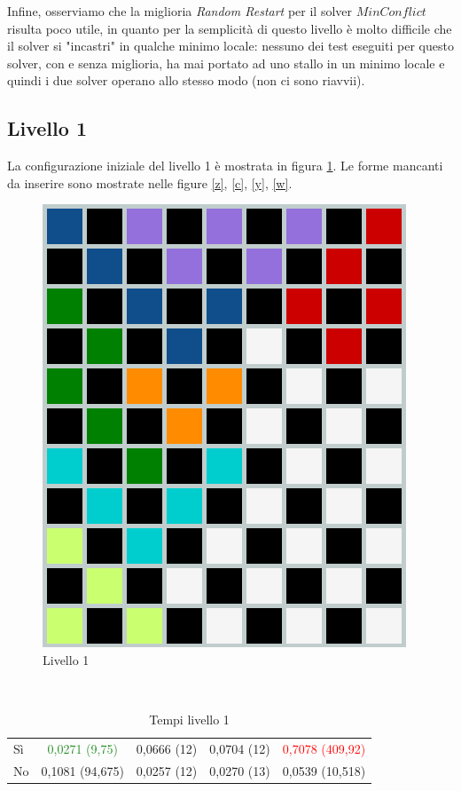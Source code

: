 Infine, osserviamo che la miglioria \textit{Random Restart} per il solver $MinConflict$ risulta poco utile, in quanto per la semplicità di questo livello è molto difficile che il solver si "incastri" in qualche minimo locale: nessuno dei test eseguiti per questo solver, con e senza miglioria, ha mai portato ad uno stallo in un minimo locale e quindi i due solver operano allo stesso modo (non ci sono riavvii).
\subsection{Livello 1}
La configurazione iniziale del livello 1 è mostrata in figura \ref{lev1}. Le forme mancanti da inserire sono mostrate nelle figure \ref{z}, \ref{c}, \ref{y}, \ref{w}.
\begin{figure}[h]
	\centering
	\includegraphics[scale=0.3]{immagini/lv1}
	\caption{Livello 1}
	\label{lev1}
\end{figure}
\\
\noindent
\begin{table} [h]
	\begin{tabular}{|l||*{4}{c|}}\hline 
		\backslashbox{Miglioria}{Solver} 
		&\makebox{DFS}&\makebox{Backtracking}&\makebox{Recursive Backtracking}	&\makebox{MinConflict}\\ \hline 
		Sì&\textcolor{ForestGreen}{0,0271 (9,75)}&0,0666 (12)&0,0704 (12)&\textcolor{red}{0,7078 (409,92)} \\ \hline 
		No&0,1081 (94,675)&0,0257 (12)&0,0270 (13)&0,0539 (10,518)  \\ \hline 
	\end{tabular} 
	\caption{Tempi livello 1}
\end{table}

